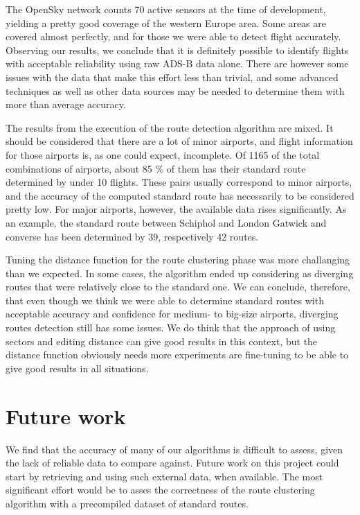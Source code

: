\documentclass{vldb}
\begin{document}
The OpenSky network counts 70 active sensors at the time of development,
yielding a pretty good coverage of the western Europe area. Some areas are
covered almost perfectly, and for those we were able to detect flight accurately.
Observing our results, we conclude that it is definitely possible to
identify flights with acceptable reliability using raw ADS-B data alone. There
are however some issues with the data that make this effort less than
trivial, and some advanced techniques as well as other data sources may be
needed to determine them with more than average accuracy.

The results from the execution of the route detection algorithm are mixed.
It should be considered that there are a lot of minor airports, and flight
information for those airports is, as one could expect, incomplete.
Of 1165 of the total combinations of airports, about 85 \% of them has their
standard route determined by under 10 flights. These pairs usually correspond
to minor airports, and the accuracy of the computed standard route has
necessarily to be considered pretty low. For major airports, however, the
available data rises significantly. As an example, the standard route between
Schiphol and London Gatwick and converse has been determined by 39,
respectively 42 routes.

Tuning the distance function for the route clustering phase was more challanging
than we expected. In some cases, the algorithm ended up considering as diverging
routes that were relatively close to the standard one. We can conclude,
therefore, that even though we think we were able to determine standard routes
with acceptable accuracy and confidence for medium- to big-size airports,
diverging routes detection still has some issues. We do think that the approach
of using sectors and editing distance can give good results in this context, but
the distance function obviously needs more experiments are fine-tuning to
be able to give good results in all situations.

\section{Future work}

We find that the accuracy of many of our algorithms is difficult to assess,
given the lack of reliable data to compare against. Future work on this project
could start by retrieving and using such external data, when available. The most
significant effort would be to asses the correctness of the route clustering
algorithm with a precompiled dataset of standard routes.
\end{document}
